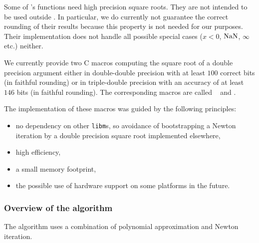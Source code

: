 Some of \crlibm's functions need high precision square roots.  They
are not intended to be used outside \crlibm. In particular, we do
currently not guarantee the correct rounding of their results because
this property is not needed for our purposes. Their implementation
does not handle all possible special cases ($x < 0$, $\mathrm{NaN}$, $\infty$
etc.) neither.

We currently provide two C macros computing the square root of a
double precision argument either in double-double precision with at
least $100$ correct bits (in faithful rounding) or in triple-double
precision with an accuracy of at least $146$ bits (in faithful
rounding). The corresponding macros are called \SqrtD~ and
\SqrtT.

The implementation of these macros was guided by the following
principles:
\begin{itemize}
\item no dependency on other \texttt{libm}s, so avoidance of
bootstrapping a Newton iteration by a double precision square root
implemented elsewhere,
\item high efficiency,
\item a small memory footprint,
\item the possible use of hardware support on some platforms in the
future.
\end{itemize}
\subsubsection{Overview of the algorithm}
The algorithm uses a combination of polynomial approximation and
Newton iteration.

